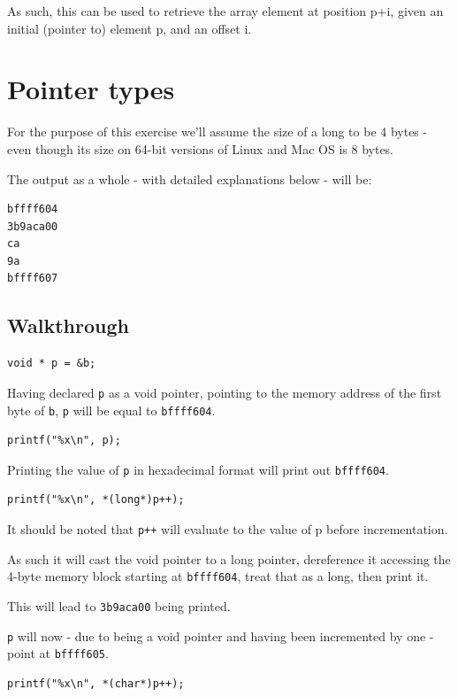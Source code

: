 \documentclass[a4paper]{scrartcl}
\begin{document}
As such, this can be used to retrieve the array element at position p+i, given
an initial (pointer to) element p, and an offset i.

\section{Pointer types}

For the purpose of this exercise we'll assume the size of a long to be 4 bytes
- even though its size on 64-bit versions of Linux and Mac OS is 8 bytes.

The output as a whole - with detailed explanations below - will be:

\begin{lstlisting}
bffff604
3b9aca00
ca
9a
bffff607
\end{lstlisting}


\subsection{Walkthrough}

\begin{lstlisting}
void * p = &b;
\end{lstlisting}

Having declared \texttt{p} as a void pointer, pointing to the memory address of
the first byte of \texttt{b}, \texttt{p} will be equal to \texttt{bffff604}.

\begin{lstlisting}
printf("%x\n", p);
\end{lstlisting}

Printing the value of \texttt{p} in hexadecimal format will print out
\texttt{bffff604}.

\begin{lstlisting}
printf("%x\n", *(long*)p++);
\end{lstlisting}

It should be noted that \texttt{p++} will evaluate to the value of p before incrementation.

As such it will cast the void pointer to a long pointer, dereference it
accessing the 4-byte memory block starting at \texttt{bffff604}, treat that as
a long, then print it.

This will lead to \texttt{3b9aca00} being printed.

\texttt{p} will now - due to being a void pointer and having been incremented
by one - point at \texttt{bffff605}.

\begin{lstlisting}
printf("%x\n", *(char*)p++);
\end{lstlisting}
\end{document}
